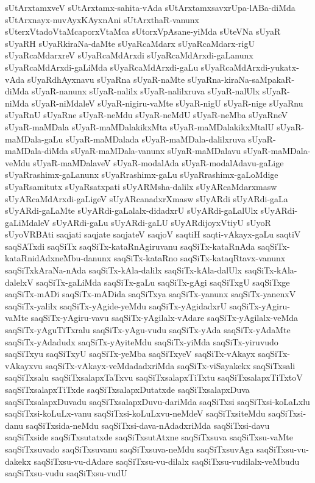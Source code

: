 {sUtArxtamxveV
sUtArxtamx-sahita-vAda
sUtArxtamxsavxrUpa-lABa-diMda
sUtArxnayx-nuvAyxKAyxnAni
sUtArxthaR-vanunx
sUterxVtadoVtaMcaporxVtaMca
sUtorxVpAsane-yiMda
sUteVNa
sUyaR
sUyaRH
sUyaRkiraNa-daMte
sUyaRcaMdarx
sUyaRcaMdarx-rigU
sUyaRcaMdarxreV
sUyaRcaMdArxdi
sUyaRcaMdArxdi-gaLanunx
sUyaRcaMdArxdi-gaLiMda
sUyaRcaMdArxdi-gaLu
sUyaRcaMdArxdi-yukatx-vAda
sUyaRdhAyxnavu
sUyaRna
sUyaR-naMte
sUyaRna-kiraNa-saMpakaR-diMda
sUyaR-nanunx
sUyaR-nalilx
sUyaR-nalilxruva
sUyaR-nalUlx
sUyaR-niMda
sUyaR-niMdaleV
sUyaR-nigiru-vaMte
sUyaR-nigU
sUyaR-nige
sUyaRnu
sUyaRnU
sUyaRne
sUyaR-neMdu
sUyaR-neMdU
sUyaR-neMba
sUyaRneV
sUyaR-maMDala
sUyaR-maMDalakikxMta
sUyaR-maMDalakikxMtalU
sUyaR-maMDala-gaLu
sUyaR-maMDalada
sUyaR-maMDala-dalilxruva
sUyaR-maMDala-diMda
sUyaR-maMDala-vanunx
sUyaR-maMDalavu
sUyaR-maMDala-veMdu
sUyaR-maMDalaveV
sUyaR-modalAda
sUyaR-modalAdavu-gaLige
sUyaRrashimx-gaLanunx
sUyaRrashimx-gaLu
sUyaRrashimx-gaLoMdige
sUyaRsamitutx
sUyaRsatxpati
sUyARMsha-dalilx
sUyARcaMdarxmasw
sUyARcaMdArxdi-gaLigeV
sUyARcanadxrXmasw
sUyARdi
sUyARdi-gaLa
sUyARdi-gaLaMte
sUyARdi-gaLalalx-didadxrU
sUyARdi-gaLalUlx
sUyARdi-gaLiMdaleV
sUyARdi-gaLu
sUyARdi-gaLU
sUyARdijoyxVtiyU
sUyoR
sUyoVRBAti
saqjati
saqjate
saqjateV
saqjoV
saqtiH
saqti-vAkayx-gaLu
saqtiV
saqSATxdi
saqSiTx
saqSiTx-kataRnAgiruvanu
saqSiTx-kataRnAda
saqSiTx-kataRnidAdxneMbu-danunx
saqSiTx-kataRno
saqSiTx-kataqRtavx-vanunx
saqSiTxkAraNa-nAda
saqSiTx-kAla-dalilx
saqSiTx-kAla-dalUlx
saqSiTx-kAla-dalelxV
saqSiTx-gaLiMda
saqSiTx-gaLu
saqSiTx-gAgi
saqSiTxgU
saqSiTxge
saqSiTx-mADi
saqSiTx-mADida
saqSiTxya
saqSiTx-yanunx
saqSiTx-yanenxV
saqSiTx-yalilx
saqSiTx-yAgide-yeMdu
saqSiTx-yAgidadxrU
saqSiTx-yAgiru-vaMte
saqSiTx-yAgiru-vavu
saqSiTx-yAgilalx-vAdare
saqSiTx-yAgilalx-veMda
saqSiTx-yAguTiTxralu
saqSiTx-yAgu-vudu
saqSiTx-yAda
saqSiTx-yAdaMte
saqSiTx-yAdadudx
saqSiTx-yAyiteMdu
saqSiTx-yiMda
saqSiTx-yiruvudo
saqSiTxyu
saqSiTxyU
saqSiTx-yeMba
saqSiTxyeV
saqSiTx-vAkayx
saqSiTx-vAkayxvu
saqSiTx-vAkayx-veMdadadxriMda
saqSiTx-viSayakekx
saqSiTxsali
saqSiTxsalu
saqSiTxsalapxTaTxvu
saqSiTxsalapxTiTxtu
saqSiTxsalapxTiTxtoV
saqSiTxsalapxTiTxde
saqSiTxsalapxDutatxde
saqSiTxsalapxDuva
saqSiTxsalapxDuvadu
saqSiTxsalapxDuvu-dariMda
saqSiTxsi
saqSiTxsi-koLaLxlu
saqSiTxsi-koLuLx-vanu
saqSiTxsi-koLuLxvu-neMdeV
saqSiTxsiteMdu
saqSiTxsi-danu
saqSiTxsida-neMdu
saqSiTxsi-dava-nAdadxriMda
saqSiTxsi-davu
saqSiTxside
saqSiTxsutatxde
saqSiTxsutAtxne
saqSiTxsuva
saqSiTxsu-vaMte
saqSiTxsuvado
saqSiTxsuvanu
saqSiTxsuva-neMdu
saqSiTxsuvAga
saqSiTxsu-vu-dakekx
saqSiTxsu-vu-dAdare
saqSiTxsu-vu-dilalx
saqSiTxsu-vudilalx-veMbudu
saqSiTxsu-vudu
saqSiTxsu-vudU
}
